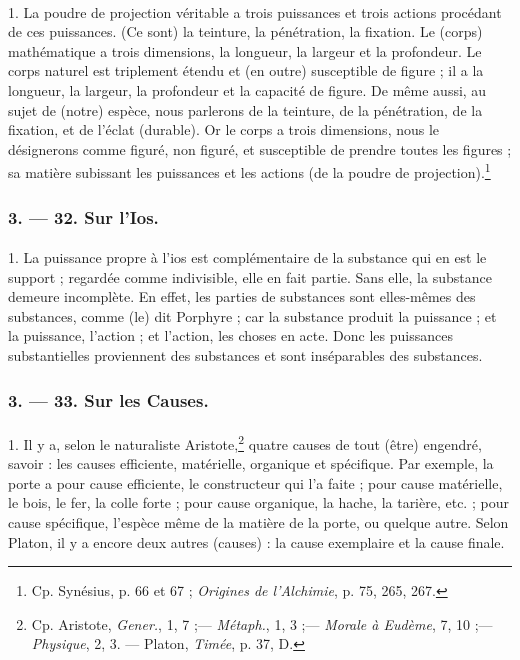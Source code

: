 \documentclass[a4paper, 11pt, oneside, polutonikogreek, french]{article}
\begin{document}
\paragraph{}
1. La poudre de projection véritable a trois puissances et trois actions procédant de ces puissances. (Ce sont) la teinture, la pénétration, la fixation. Le (corps) mathématique a trois dimensions, la longueur, la largeur et la profondeur. Le corps naturel est triplement étendu et (en outre) susceptible de figure ; il a la longueur, la largeur, la profondeur et la capacité de figure. De même aussi, au sujet de (notre) espèce, nous parlerons de la teinture, de la pénétration, de la fixation, et de l'éclat (durable). Or le corps a trois dimensions, nous le désignerons comme figuré, non figuré, et susceptible de prendre toutes les figures ; sa matière subissant les puissances et les actions (de la poudre de projection).\footnote{Cp. Synésius, p. 66 et 67 ; \emph{Origines de l'Alchimie}, p. 75, 265, 267.}

\bigskip
\centerline{\EightStarTaper}
\centerline{\EightStarTaper\EightStarTaper}
\bigskip

\subsubsection{3. --- 32. Sur l'Ios.}
\paragraph{}
1. La puissance propre à l'ios est complémentaire de la substance qui en est le support ; regardée comme indivisible, elle en fait partie. Sans elle, la substance demeure incomplète. En effet, les parties de substances sont elles-mêmes des substances, comme (le) dit Porphyre ; car la substance produit la puissance ; et la puissance, l'action ; et l'action, les choses en acte. Donc les puissances substantielles proviennent des substances et sont inséparables des substances.

\bigskip
\centerline{\EightStarTaper}
\centerline{\EightStarTaper\EightStarTaper}
\bigskip

\subsubsection{3. --- 33. Sur les Causes.}
\paragraph{}
1. Il y a, selon le naturaliste Aristote,\footnote{Cp. Aristote, \emph{Gener.}, 1, 7 ;--- \emph{Métaph.}, 1, 3 ;--- \emph{Morale à Eudème}, 7, 10 ;--- \emph{Physique}, 2, 3. --- Platon, \emph{Timée}, p. 37, D.} quatre causes de tout (être) engendré, savoir : les causes efficiente, matérielle, organique et spécifique. Par exemple, la porte a pour cause efficiente, le constructeur qui l'a faite ; pour cause matérielle, le bois, le fer, la colle forte ; pour cause organique, la hache, la tarière, etc. ; pour cause spécifique, l'espèce même de la matière de la porte, ou quelque autre. Selon Platon, il y a encore deux autres (causes) : la cause exemplaire et la cause finale.
\end{document}

